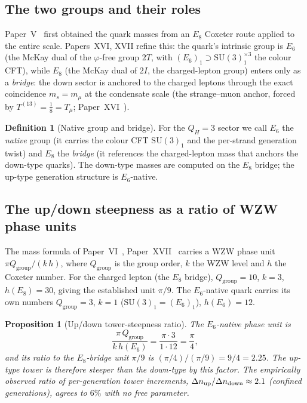\documentclass[11pt,a4paper]{article}
\newtheorem{proposition}[theorem]{Proposition}
\theoremstyle{definition}\newtheorem{definition}[theorem]{Definition}
\theoremstyle{remark}
\newcommand{\vp}{\varphi}
\newcommand{\SU}{\mathrm{SU}}
\newcommand{\twoI}{2I}
\newcommand{\twoT}{2T}
\newcommand{\QH}{Q_H}
\newcommand{\Qgr}{Q_{\mathrm{group}}}
\begin{document}
\subsection{The two groups and their roles}

Paper~V~\cite{Paper5} first obtained the quark masses from an $E_8$
Coxeter route applied to the entire scale. Papers~XVI, XVII refine this:
the quark's intrinsic group is $E_6$ (the McKay dual of the $\vp$-free
group $\twoT$, with $(E_6)_1\supset\SU(3)_1^{\times3}$ the colour CFT),
while $E_8$ (the McKay dual of $\twoI$, the charged-lepton group) enters
only as a \emph{bridge}: the down sector is anchored to the charged
leptons through the exact coincidence $m_s=m_\mu$ at the condensate
scale (the strange--muon anchor, forced by $T^{(13)}=\tfrac18=T_\mu$;
Paper~XVI~\cite{Paper16}). %

\begin{definition}[Native group and bridge]
\label{P20:def:native_bridge}
For the $\QH=3$ sector we call $E_6$ the \emph{native} group (it
carries the colour CFT $\SU(3)_1$ and the per-strand generation twist)
and $E_8$ the \emph{bridge} (it references the charged-lepton mass that
anchors the down-type quarks). The down-type masses are computed on the
$E_8$ bridge; the up-type generation structure is $E_6$-native.
\end{definition}

\subsection{The up/down steepness as a ratio of WZW phase units}

The mass formula of Paper~VI~\cite{Paper6}, Paper~XVII~\cite{Paper17}
carries a WZW phase unit $\pi\Qgr/(k\,h)$, where $\Qgr$ is the group
order, $k$ the WZW level and $h$ the Coxeter number. For the charged
lepton (the $E_8$ bridge), $\Qgr=10$, $k=3$, $h(E_8)=30$, giving the
established unit $\pi/9$. The $E_6$-native quark carries its own numbers
$\Qgr=3$, $k=1$ ($\SU(3)_1=(E_6)_1$), $h(E_6)=12$.

\begin{proposition}[Up/down tower-steepness ratio]
\label{P20:prop:steepness}
The $E_6$-native phase unit is
\begin{equation}
  \frac{\pi\,\Qgr}{k\,h(E_6)}=\frac{\pi\cdot3}{1\cdot12}=\frac{\pi}{4},
  \label{P20:eq:e6phase}
\end{equation}
and its ratio to the $E_8$-bridge unit $\pi/9$ is
$(\pi/4)/(\pi/9)=9/4=2.25$. The up-type tower is therefore steeper than
the down-type by this factor. The empirically observed ratio of
per-generation tower increments, $\Delta n_{\rm up}/\Delta n_{\rm down}
\approx2.1$ (confined generations), agrees to $6\%$ with no free
parameter.
\end{proposition}
\end{document}
